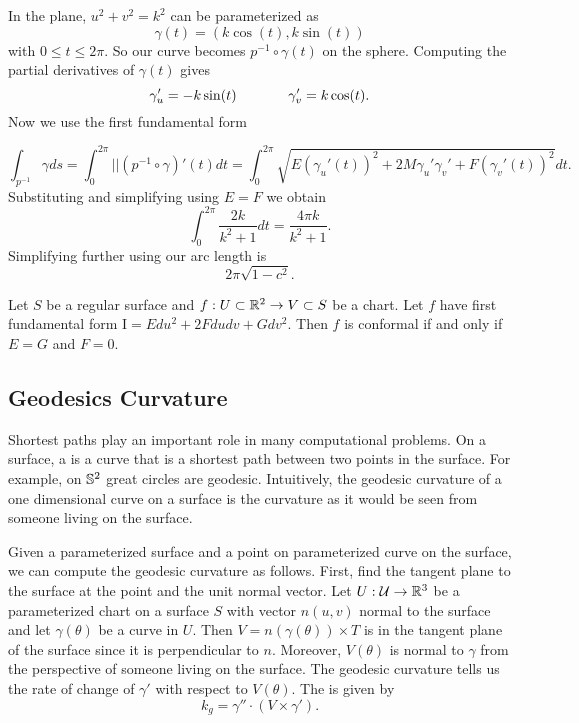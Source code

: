 \begin{example}
In the plane, $u^2+v^2=k^2$ can be parameterized
as $$\gamma(t)=(k\cos(t),k\sin(t))$$ with $0\leq t\leq 2\pi.$
So our curve becomes $p^{-1}\circ \gamma(t)$ on the sphere.
Computing the partial derivatives of $\gamma(t)$ gives
$$\gamma_u'=-k\sin(t)\hspace{1.3cm}  \gamma_v'=k\cos(t).$$
Now we use the first fundamental form

$$\int_{p^{-1}}\gamma ds=\int_{0}^{2\pi} ||(p^{-1}\circ \gamma)'(t)dt=\int_0^{2\pi}\sqrt{E(\gamma_u'(t))^2+2M\gamma_u'\gamma_v'+
F(\gamma_v'(t))^2}dt.$$
Substituting and simplifying using $E=F$ we obtain
$$\int_0^{2\pi}\frac{2k}{k^2+1}dt=\frac{4\pi k}{k^2+1}.$$
Simplifying further using   our arc length is
$$2\pi\sqrt{1-c^2}.$$

\end{example}



\begin{theorem}\label{thm:first-conformal}
	Let $S$ be a regular surface and $f:U\subset \mathbb{R}^2 \to V\subset S$ be a chart.
	Let $f$ have first fundamental form $\mathrm{I}=Edu^2+2Fdudv +Gdv^2$.
	Then $f$ is conformal if and only if $E=G$ and $F=0.$
\end{theorem}


\subsection{Geodesics Curvature}

Shortest paths play an important role in many computational problems.
On a surface, a  is a curve that is a shortest path
between two points in the surface. 
For example, on $\mathbb{S}^2$ great circles are geodesic.
Intuitively, the geodesic curvature of a one dimensional curve on a surface
is the curvature as it would be seen from someone living on the surface.


Given a parameterized surface and a point on parameterized curve on the surface,
we can compute the geodesic curvature as follows.
First, find the tangent plane to the surface at the point and the unit normal vector.
Let $U:\mathcal{U}\to \mathbb{R}^3$ be a parameterized chart on a surface $S$ with vector $n(u,v)$ normal
to the surface
and let $\gamma(\theta)$ be a curve in $U$.
Then $V=n(\gamma(\theta))\times T$ is in the tangent plane of the surface since
it is perpendicular to $n$. Moreover, $V(\theta)$ is normal to $\gamma$ 
from the perspective of someone living on the surface. 
The geodesic curvature tells us the rate of change of $\gamma'$ with respect 
to $V(\theta)$.
The  is given by 
\begin{equation} \label{eqn:geodesic}
	k_g=\gamma'' \cdot (V\times \gamma').
\end{equation}

